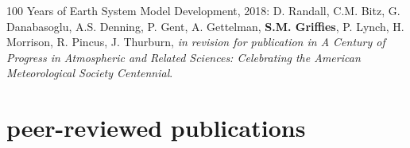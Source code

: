 \begin{etaremune}
\item 100 Years of Earth System Model Development, 2018: D. Randall, C.M. Bitz, G. Danabasoglu, A.S. Denning, P. Gent, A. Gettelman, {\bf S.M. Grif\/f\/ies}, P. Lynch, H. Morrison, R. Pincus, J. Thurburn, {\it in revision for publication in A Century of Progress in Atmospheric and Related Sciences: Celebrating the American Meteorological Society Centennial}.   
       


\end{etaremune}


\section*{\sc \color{Maroon} peer-reviewed publications}

\small 

